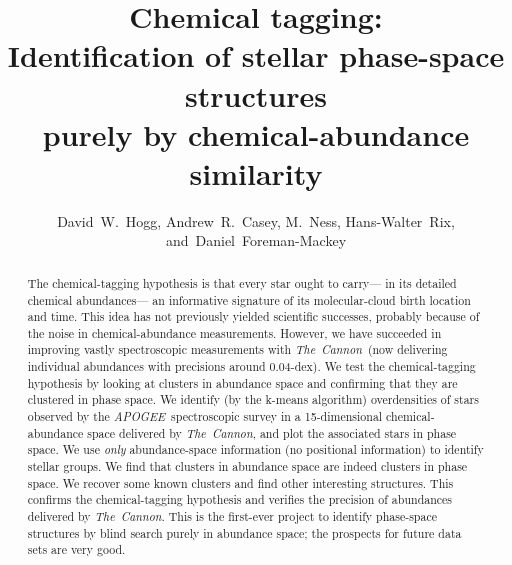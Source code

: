 \documentclass[12pt, letterpaper, preprint]{aastex}
\newcommand{\acronym}[1]{{\small{#1}}}
\newcommand{\project}[1]{\textsl{#1}}
\newcommand{\apogee}{\project{\acronym{APOGEE}}}
\newcommand{\thecannon}{\project{The~Cannon}}
\begin{document}
\sloppy\sloppypar

\title{Chemical tagging: \\
       Identification of stellar phase-space structures \\
       purely by chemical-abundance similarity}
\author{David~W.~Hogg,
        Andrew~R.~Casey,
        M.~Ness,
        Hans-Walter~Rix,
    and~Daniel~Foreman-Mackey}

\begin{abstract}
The chemical-tagging hypothesis is that every star ought to carry---%
in its detailed chemical abundances---%
an informative signature of its molecular-cloud birth location and time.
This idea has not previously yielded scientific successes, probably because of the
noise in chemical-abundance measurements.
However, we have succeeded in improving vastly spectroscopic measurements with \thecannon\ 
(now delivering individual abundances with precisions around 0.04-dex).
We test the chemical-tagging hypothesis by looking at clusters in abundance space
and confirming that they are clustered in phase space.
We identify (by the k-means algorithm) overdensities of stars observed by the \apogee\ spectroscopic survey
in a 15-dimensional chemical-abundance space delivered by \thecannon,
and plot the associated stars in phase space.
We use \emph{only} abundance-space information (no positional information) to identify stellar groups.
We find that clusters in abundance space are indeed clusters in phase space.
We recover some known clusters and find other interesting structures.
This confirms the chemical-tagging hypothesis and verifies the precision of abundances delivered by \thecannon.
This is the first-ever project to identify phase-space structures by blind search purely in abundance space;
the prospects for future data sets are very good.
\end{abstract}

\end{document}
